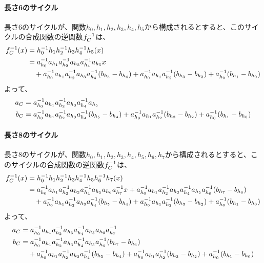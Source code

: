 \documentclass[a4paper,11pt,dvipdfmx]{jsarticle}
\theoremstyle{definition}
\begin{document}
\paragraph{長さ6のサイクル}
長さ6のサイクルが、関数$h_0, h_1, h_2, h_3, h_4, h_5$から構成されるとすると、このサイクルの合成関数の逆関数$f_C^{-1}$は、
\begin{align}
  f_C^{-1}(x) &= h_0^{-1} h_1 h_2^{-1} h_3 h_4^{-1} h_5(x)\\
  &= a_{h_0}^{-1} a_{h_1}a_{h_2}^{-1} a_{h_3}a_{h_4}^{-1} a_{h_5}x \\
  &\quad + a_{h_0}^{-1} a_{h_1}a_{h_2}^{-1} a_{h_3}a_{h_4}^{-1}(b_{h_5}-b_{h_4}) + a_{h_0}^{-1} a_{h_1}a_{h_2}^{-1}(b_{h_3}-b_{h_2}) + a_{h_0}^{-1}(b_{h_1}-b_{h_0})
\end{align}
よって、
\begin{align}
  a_C &= a_{h_0}^{-1} a_{h_1}a_{h_2}^{-1} a_{h_3}a_{h_4}^{-1} a_{h_5}\\
  b_C &= a_{h_0}^{-1} a_{h_1}a_{h_2}^{-1} a_{h_3}a_{h_4}^{-1}(b_{h_5}-b_{h_4}) + a_{h_0}^{-1} a_{h_1}a_{h_2}^{-1}(b_{h_3}-b_{h_2}) + a_{h_0}^{-1}(b_{h_1}-b_{h_0})
\end{align}

\paragraph{長さ8のサイクル}
長さ8のサイクルが、関数$h_0, h_1, h_2, h_3, h_4, h_5, h_6, h_7$から構成されるとすると、このサイクルの合成関数の逆関数$f_C^{-1}$は、
\begin{align}
  f_C^{-1}(x) &= h_0^{-1} h_1 h_2^{-1} h_3 h_4^{-1} h_5 h_6^{-1} h_7(x)\\
  &= a_{h_0}^{-1} a_{h_1}a_{h_2}^{-1} a_{h_3}a_{h_4}^{-1} a_{h_5}a_{h_6}a_{h_7}^{-1} x + a_{h_0}^{-1} a_{h_1}a_{h_2}^{-1} a_{h_3}a_{h_4}^{-1} a_{h_5}a_{h_6}^{-1}(b_{h_7}-b_{h_6})\\
  &\quad + a_{h_0}^{-1} a_{h_1}a_{h_2}^{-1} a_{h_3}a_{h_4}^{-1}(b_{h_5}-b_{h_4}) + a_{h_0}^{-1} a_{h_1}a_{h_2}^{-1}(b_{h_3}-b_{h_2}) + a_{h_0}^{-1}(b_{h_1}-b_{h_0})
\end{align}
よって、
\begin{align}
  a_C &= a_{h_0}^{-1} a_{h_1}a_{h_2}^{-1} a_{h_3}a_{h_4}^{-1} a_{h_5}a_{h_6}a_{h_7}^{-1}\\
  b_C &= a_{h_0}^{-1} a_{h_1}a_{h_2}^{-1} a_{h_3}a_{h_4}^{-1} a_{h_5}a_{h_6}^{-1}(b_{h_7}-b_{h_6})\\
  &\quad + a_{h_0}^{-1} a_{h_1}a_{h_2}^{-1} a_{h_3}a_{h_4}^{-1}(b_{h_5}-b_{h_4}) + a_{h_0}^{-1} a_{h_1}a_{h_2}^{-1}(b_{h_3}-b_{h_2}) + a_{h_0}^{-1}(b_{h_1}-b_{h_0})
\end{align}
\end{document}
